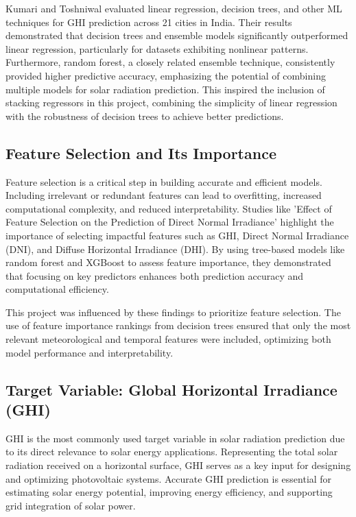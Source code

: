 \documentclass[10pt,twocolumn]{article}
\begin{document}
\begin{itemize}
Kumari and Toshniwal \cite{14} evaluated linear regression, decision trees, and other ML techniques for GHI prediction across 21 cities in India. Their results demonstrated that decision trees and ensemble models significantly outperformed linear regression, particularly for datasets exhibiting nonlinear patterns. Furthermore, random forest, a closely related ensemble technique, consistently provided higher predictive accuracy, emphasizing the potential of combining multiple models for solar radiation prediction. This inspired the inclusion of stacking regressors in this project, combining the simplicity of linear regression with the robustness of decision trees to achieve better predictions.

\subsection{Feature Selection and Its Importance}
Feature selection is a critical step in building accurate and efficient models. Including irrelevant or redundant features can lead to overfitting, increased computational complexity, and reduced interpretability. Studies like 'Effect of Feature Selection on the Prediction of
Direct Normal Irradiance' \cite{4} highlight the importance of selecting impactful features such as GHI, Direct Normal Irradiance (DNI), and Diffuse Horizontal Irradiance (DHI). By using tree-based models like random forest and XGBoost to assess feature importance, they demonstrated that focusing on key predictors enhances both prediction accuracy and computational efficiency.

This project was influenced by these findings to prioritize feature selection. The use of feature importance rankings from decision trees ensured that only the most relevant meteorological and temporal features were included, optimizing both model performance and interpretability.

\subsection{Target Variable: Global Horizontal Irradiance (GHI)}
GHI is the most commonly used target variable in solar radiation prediction due to its direct relevance to solar energy applications. Representing the total solar radiation received on a horizontal surface, GHI serves as a key input for designing and optimizing photovoltaic systems. Accurate GHI prediction is essential for estimating solar energy potential, improving energy efficiency, and supporting grid integration of solar power.


\end{itemize}
\end{document}
